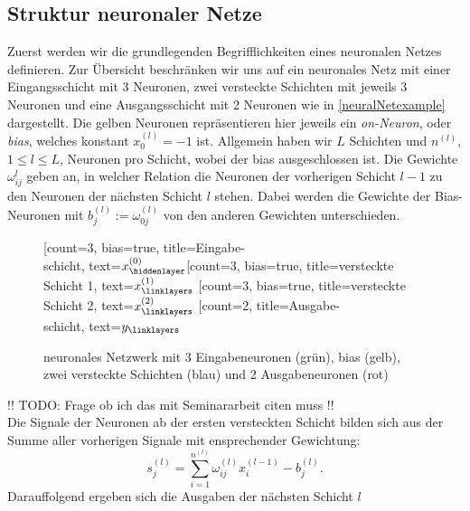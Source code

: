 \subsection{Struktur neuronaler Netze}
\label{subsec:struktur-eines-neuronalen-netzes}
Zuerst werden wir die grundlegenden Begrifflichkeiten eines neuronalen Netzes definieren. Zur Übersicht beschränken
wir uns auf ein neuronales Netz mit einer Eingangsschicht mit $3$ Neuronen, zwei versteckte Schichten mit jeweils
3 Neuronen und eine Ausgangsschicht mit 2 Neuronen wie in \eqref{neuralNetexample} dargestellt. Die gelben Neuronen
repräsentieren hier jeweils ein \textit{on-Neuron}, oder \textit{bias}, welches konstant $x_0^{(l)} = -1$ ist. Allgemein
haben wir $L$ Schichten und $n^{(l)}$, $1\leq l \leq L$, Neuronen pro Schicht, wobei der bias ausgeschlossen ist.
Die Gewichte $\omega_{ij}^{l}$ geben an, in welcher Relation die Neuronen der vorherigen Schicht $l-1$ zu den Neuronen der
nächsten Schicht $l$ stehen. Dabei werden die Gewichte der Bias-Neuronen mit $b_j^{(l)}:= \omega_{0j}^{(l)}$ von den
anderen Gewichten unterschieden.
\begin{figure}[htp]
    \centering
    \begin{neuralnetwork}[height=4]
        \newcommand{\x}[2]{$x^{(0)}_#2$}
        \newcommand{\y}[2]{$y_#2$}
        \newcommand{\hfirst}[2]{\small $x^{(1)}_#2$}
        \newcommand{\hsecond}[2]{\small $x^{(2)}_#2$}
        [count=3, bias=true, title=Eingabe-\\schicht, text=\x]
        \hiddenlayer[count=3, bias=true, title=versteckte\\Schicht 1, text=\hfirst]
        \linklayers
        \hiddenlayer[count=3, bias=true, title=versteckte\\Schicht 2, text=\hsecond]
        \linklayers
        \outputlayer[count=2, title=Ausgabe-\\schicht, text=\y] \linklayers
    \end{neuralnetwork}
    \caption{neuronales Netzwerk mit 3 Eingabeneuronen (grün), bias (gelb), zwei versteckte Schichten
        (blau) und 2 Ausgabeneuronen (rot)}
    \label{neuralNetexample}
\end{figure}
!! TODO: Frage ob ich das mit Seminararbeit citen muss !!\\
Die Signale der Neuronen ab der ersten versteckten Schicht bilden sich aus der Summe aller vorherigen
Signale mit ensprechender Gewichtung:
\[
    s_j^{(l)} = \sum_{i=1}^{n^{(l)}} \omega_{ij}^{(l)} x_i^{(l-1)} - b_j^{(l)}.
\]
Darauffolgend ergeben sich die Ausgaben der nächsten Schicht $l$
